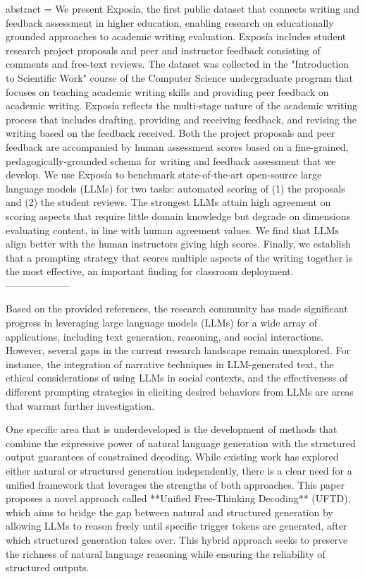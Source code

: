 {      abstract = {We present Exposía, the first public dataset that connects writing and feedback assessment in higher education, enabling research on educationally grounded approaches to academic writing evaluation. Exposía includes student research project proposals and peer and instructor feedback consisting of comments and free-text reviews. The dataset was collected in the "Introduction to Scientific Work" course of the Computer Science undergraduate program that focuses on teaching academic writing skills and providing peer feedback on academic writing. Exposía reflects the multi-stage nature of the academic writing process that includes drafting, providing and receiving feedback, and revising the writing based on the feedback received. Both the project proposals and peer feedback are accompanied by human assessment scores based on a fine-grained, pedagogically-grounded schema for writing and feedback assessment that we develop.   We use Exposía to benchmark state-of-the-art open-source large language models (LLMs) for two tasks: automated scoring of (1) the proposals and (2) the student reviews. The strongest LLMs attain high agreement on scoring aspects that require little domain knowledge but degrade on dimensions evaluating content, in line with human agreement values. We find that LLMs align better with the human instructors giving high scores. Finally, we establish that a prompting strategy that scores multiple aspects of the writing together is the most effective, an important finding for classroom deployment.}
}
        --------------------
        


Based on the provided references, the research community has made significant progress in leveraging large language models (LLMs) for a wide array of applications, including text generation, reasoning, and social interactions. However, several gaps in the current research landscape remain unexplored. For instance, the integration of narrative techniques in LLM-generated text, the ethical considerations of using LLMs in social contexts, and the effectiveness of different prompting strategies in eliciting desired behaviors from LLMs are areas that warrant further investigation.

One specific area that is underdeveloped is the development of methods that combine the expressive power of natural language generation with the structured output guarantees of constrained decoding. While existing work has explored either natural or structured generation independently, there is a clear need for a unified framework that leverages the strengths of both approaches. This paper proposes a novel approach called **Unified Free-Thinking Decoding** (UFTD), which aims to bridge the gap between natural and structured generation by allowing LLMs to reason freely until specific trigger tokens are generated, after which structured generation takes over. This hybrid approach seeks to preserve the richness of natural language reasoning while ensuring the reliability of structured outputs.


